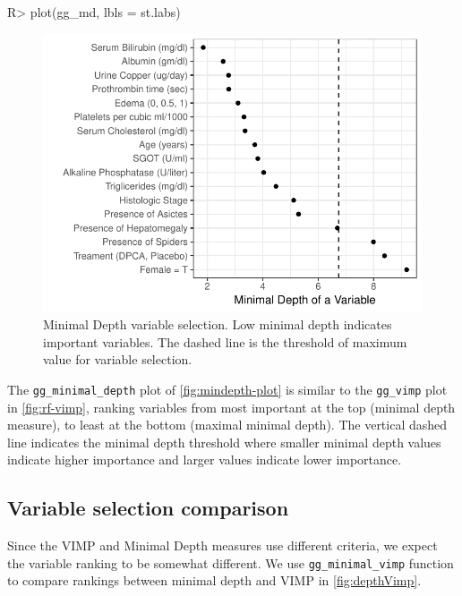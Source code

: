 \documentclass[article]{jss}
\begin{document}
\begin{Schunk}
\begin{Sinput}
R> plot(gg_md, lbls = st.labs)
\end{Sinput}
\begin{figure}[!htb]

{\centering \includegraphics{rfs-mindepth-plot-1} 

}

\caption[Minimal Depth variable selection]{Minimal Depth variable selection. Low minimal depth indicates important variables. The dashed line is the threshold of maximum value for variable selection.}\label{fig:mindepth-plot}
\end{figure}
\end{Schunk}

The \texttt{gg\_minimal\_depth} plot of \autoref{fig:mindepth-plot} is
similar to the \texttt{gg\_vimp} plot in \autoref{fig:rf-vimp}, ranking
variables from most important at the top (minimal depth measure), to
least at the bottom (maximal minimal depth). The vertical dashed line
indicates the minimal depth threshold where smaller minimal depth values
indicate higher importance and larger values indicate lower importance.

\subsection{Variable selection
comparison}\label{variable-selection-comparison}

Since the VIMP and Minimal Depth measures use different criteria, we
expect the variable ranking to be somewhat different. We use
\texttt{gg\_minimal\_vimp} function to compare rankings between minimal
depth and VIMP in \autoref{fig:depthVimp}.
\end{document}
